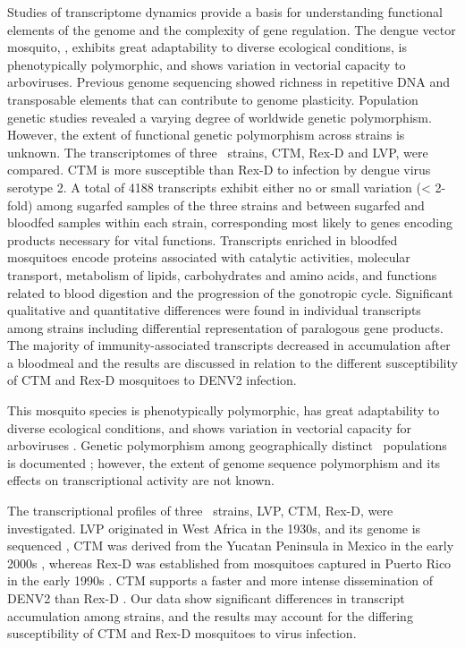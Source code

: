 Studies of transcriptome dynamics provide a basis for understanding functional elements of the genome and the complexity of gene regulation.
The dengue vector mosquito, \Aea, exhibits great adaptability to diverse ecological conditions, is phenotypically polymorphic, and shows variation in vectorial capacity to arboviruses.
Previous genome sequencing showed richness in repetitive DNA and transposable elements that can contribute to genome plasticity.
Population genetic studies revealed a varying degree of worldwide genetic polymorphism.
However, the extent of functional genetic polymorphism across strains is unknown.
The transcriptomes of three \Aa\ strains, \gls{CTM}, \gls{Rex-D} and \gls{LVP}, were compared.
\gls{CTM} is more susceptible than \gls{Rex-D} to infection by dengue virus serotype 2.
A total of 4188 transcripts exhibit either no or small variation (< 2-fold) among sugarfed samples of the three strains and between sugarfed and bloodfed samples within each strain, corresponding most likely to genes encoding products necessary for vital functions.
Transcripts enriched in bloodfed mosquitoes encode proteins associated with catalytic activities, molecular transport, metabolism of lipids, carbohydrates and amino acids, and functions related to blood digestion and the progression of the gonotropic cycle.
Significant qualitative and quantitative differences were found in individual transcripts among strains including differential representation of paralogous gene products.
The majority of immunity-associated transcripts decreased in accumulation after a bloodmeal and the results are discussed in relation to the different susceptibility of \gls{CTM} and \gls{Rex-D} mosquitoes to \gls{DENV2} infection.

This mosquito species is phenotypically polymorphic, has great adaptability to diverse ecological conditions, and shows variation in vectorial capacity for arboviruses \cite{Bennett2002,Black2002,Kuno2010}.
Genetic polymorphism among geographically distinct \Aa\ populations is documented \cite{Urdaneta-Marquez2011}; however, the extent of genome sequence polymorphism and its effects on transcriptional activity are not known.

The transcriptional profiles of three \Aa\ strains, \gls{LVP}, \gls{CTM}, \gls{Rex-D}, were investigated.
\gls{LVP} originated in West Africa in the 1930s, and its genome is sequenced \cite{Nene2007}, \gls{CTM} was derived from the Yucatan Peninsula in Mexico in the early 2000s \cite{Bennett2002,Gubler1985,Richardson2006a}, whereas \gls{Rex-D} was established from mosquitoes captured in Puerto Rico in the early 1990s \cite{Miller1991}.
\gls{CTM} supports a faster and more intense dissemination of \gls{DENV2} than \gls{Rex-D} \cite{Bennett2002,Salazar2007}.
Our data show significant differences in transcript accumulation among strains, and the results may account for the differing susceptibility of \gls{CTM} and \gls{Rex-D} mosquitoes to virus infection.



